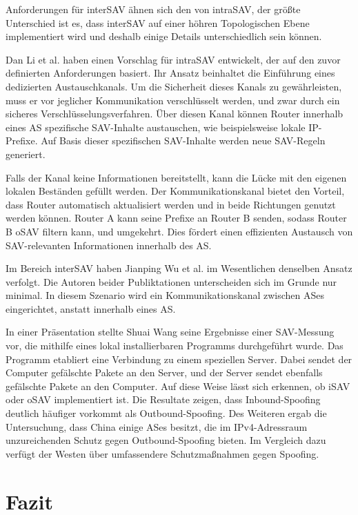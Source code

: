 \documentclass[sigplan,screen]{acmart}
\begin{document}
Anforderungen für interSAV ähnen sich den von intraSAV, der größte Unterschied ist es, dass interSAV auf einer höhren Topologischen Ebene implementiert wird und deshalb einige Details unterschiedlich sein können.

Dan Li et al. \cite{intraSAVNET01} haben einen Vorschlag für intraSAV entwickelt, der auf den zuvor definierten Anforderungen basiert. Ihr Ansatz beinhaltet die Einführung eines dedizierten Austauschkanals. Um die Sicherheit dieses Kanals zu gewährleisten, muss er vor jeglicher Kommunikation verschlüsselt werden, und zwar durch ein sicheres Verschlüsselungsverfahren. Über diesen Kanal können Router innerhalb eines AS spezifische SAV-Inhalte austauschen, wie beispielsweise lokale IP-Prefixe. Auf Basis dieser spezifischen SAV-Inhalte werden neue SAV-Regeln generiert.

Falls der Kanal keine Informationen bereitstellt, kann die Lücke mit den eigenen lokalen Beständen gefüllt werden. Der Kommunikationskanal bietet den Vorteil, dass Router automatisch aktualisiert werden und in beide Richtungen genutzt werden können. Router A kann seine Prefixe an Router B senden, sodass Router B oSAV filtern kann, und umgekehrt. Dies fördert einen effizienten Austausch von SAV-relevanten Informationen innerhalb des AS.

Im Bereich interSAV haben Jianping Wu et al. \cite{interSAVNET01} im Wesentlichen denselben Ansatz verfolgt. Die Autoren beider Publiktationen unterscheiden sich im Grunde nur minimal. In diesem Szenario wird ein Kommunikationskanal zwischen ASes eingerichtet, anstatt innerhalb eines AS.

In einer Präsentation stellte Shuai Wang \cite{largemeasurment01} seine Ergebnisse einer SAV-Messung vor, die mithilfe eines lokal installierbaren Programms durchgeführt wurde. Das Programm etabliert eine Verbindung zu einem speziellen Server. Dabei sendet der Computer gefälschte Pakete an den Server, und der Server sendet ebenfalls gefälschte Pakete an den Computer. Auf diese Weise lässt sich erkennen, ob iSAV oder oSAV implementiert ist. Die Resultate zeigen, dass Inbound-Spoofing deutlich häufiger vorkommt als Outbound-Spoofing.
Des Weiteren ergab die Untersuchung, dass China einige ASes besitzt, die im IPv4-Adressraum unzureichenden Schutz gegen Outbound-Spoofing bieten. Im Vergleich dazu verfügt der Westen über umfassendere Schutzmaßnahmen gegen Spoofing.

\section{Fazit}
\end{document}
